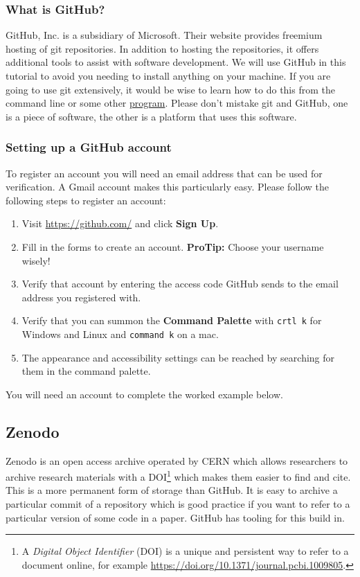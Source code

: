 \documentclass[11pt,onecolumn]{scrartcl}
\begin{document}
\subsubsection*{What is GitHub?}
\label{sec:org6c71449}

GitHub, Inc. is a subsidiary of Microsoft. Their website provides freemium
hosting of git repositories. In addition to hosting the repositories, it offers
additional tools to assist with software development. We will use GitHub in this
tutorial to avoid you needing to install anything on your machine. If you are
going to use git extensively, it would be wise to learn how to do this from the
command line or some other \hyperref[sec:orgf18f21c]{program}. Please don't mistake git and GitHub, one is
a piece of software, the other is a platform that uses this software.

\subsubsection*{Setting up a GitHub account}
\label{sec:org0ec21f9}

To register an account you will need an email address that can be used for
verification. A Gmail account makes this particularly easy. Please follow the
following steps to register an account:

\begin{enumerate}
\item Visit \url{https://github.com/} and click \textbf{Sign Up}.
\item Fill in the forms to create an account. \textbf{ProTip:} Choose your username
wisely!
\item Verify that account by entering the access code GitHub sends to the email
address you registered with.
\item Verify that you can summon the \textbf{Command Palette} with \texttt{crtl k} for Windows
and Linux and \texttt{command k} on a mac.
\item The appearance and accessibility settings can be reached by searching for
them in the command palette.
\end{enumerate}

You will need an account to complete the worked example below.

\subsection{Zenodo}
\label{sec:org09e9f3b}

Zenodo is an open access archive operated by CERN which allows researchers to
archive research materials with a DOI\footnote{A \emph{Digital Object Identifier} (DOI) is a unique and persistent way to refer to a document online, for example \url{https://doi.org/10.1371/journal.pcbi.1009805}.} which makes them easier to find and
cite. This is a more permanent form of storage than GitHub. It is easy to
archive a particular commit of a repository which is good practice if you want
to refer to a particular version of some code in a paper. GitHub has tooling for
this build in.
\end{document}
